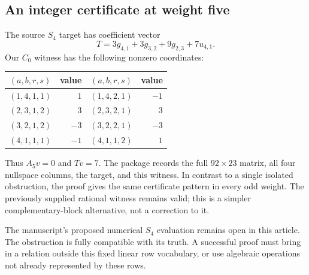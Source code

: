 \documentclass[11pt,a4paper]{article}
\numberwithin{equation}{section}
\theoremstyle{definition}\newtheorem{definition}[theorem]{Definition}
\theoremstyle{remark}\newtheorem{remark}[theorem]{Remark}
\begin{document}
\subsection{An integer certificate at weight five}
The source $S_4$ target has coefficient vector
\begin{equation}
T=3g_{4,1}+3g_{3,2}+9g_{2,3}+7u_{4,1}.
\label{eq:S4-target}
\end{equation}
Our $C_0$ witness has the following nonzero coordinates:
\begin{center}
\begin{tabular}{@{}crcr@{}}
\toprule
$(a,b,r,s)$&value&$(a,b,r,s)$&value\\\midrule
$(1,4,1,1)$&$1$&$(1,4,2,1)$&$-1$\\
$(2,3,1,2)$&$3$&$(2,3,2,1)$&$3$\\
$(3,2,1,2)$&$-3$&$(3,2,2,1)$&$-3$\\
$(4,1,1,1)$&$-1$&$(4,1,1,2)$&$1$\\\bottomrule
\end{tabular}
\end{center}
Thus $A_5v=0$ and $Tv=7$. The package records the full $92\times23$ matrix,
all four nullspace columns, the target, and this witness. In contrast to a
single isolated obstruction, the proof gives the same certificate pattern
in every odd weight. The previously supplied rational witness remains valid;
this is a simpler complementary-block alternative, not a correction to it.

The manuscript's proposed numerical $S_4$ evaluation remains open in this
article. The obstruction is fully compatible with its truth. A successful
proof must bring in a relation outside this fixed linear row vocabulary, or
use algebraic operations not already represented by these rows.
\end{document}
